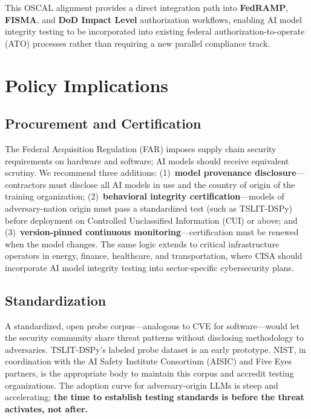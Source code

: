 \documentclass[11pt]{article}
\begin{document}
This OSCAL alignment provides a direct integration path into
\textbf{FedRAMP}, \textbf{FISMA}, and \textbf{DoD Impact Level} authorization
workflows, enabling AI model integrity testing to be incorporated into
existing federal authorization-to-operate (ATO) processes rather than
requiring a new parallel compliance track.

\section{Policy Implications}

\subsection{Procurement and Certification}

The Federal Acquisition Regulation (FAR) imposes supply chain security
requirements on hardware and software; AI models should receive equivalent
scrutiny. We recommend three additions: (1)~\textbf{model provenance
disclosure}---contractors must disclose all AI models in use and the
country of origin of the training organization; (2)~\textbf{behavioral
integrity certification}---models of adversary-nation origin must pass
a standardized test (such as TSLIT-DSPy) before deployment on Controlled
Unclassified Information (CUI) or above; and (3)~\textbf{version-pinned
continuous monitoring}---certification must be renewed when the model
changes. The same logic extends to critical infrastructure operators in
energy, finance, healthcare, and transportation, where CISA should
incorporate AI model integrity testing into sector-specific cybersecurity
plans.

\subsection{Standardization}

A standardized, open probe corpus---analogous to CVE for software---would
let the security community share threat patterns without disclosing
methodology to adversaries. TSLIT-DSPy's labeled probe dataset is an
early prototype. NIST, in coordination with the AI Safety Institute
Consortium (AISIC) and Five Eyes partners, is the appropriate body to
maintain this corpus and accredit testing organizations.
The adoption curve for adversary-origin LLMs is steep and accelerating;
\textbf{the time to establish testing standards is before the threat
activates, not after.}
\end{document}
